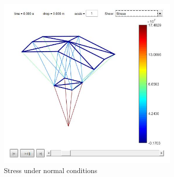 \begin{figure}[h]
	\centering
	\includegraphics[width=0.8\textwidth]{img/stress1.jpg}
	\caption{Stress under normal conditions}
	\label{fig:stress}
\end{figure}
